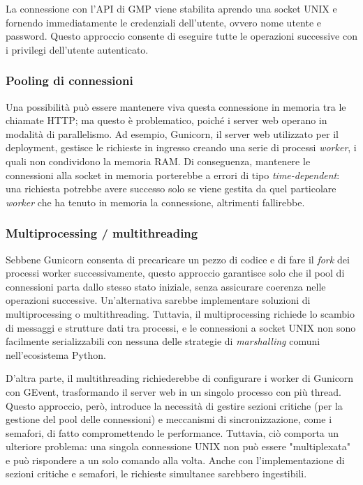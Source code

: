 La connessione con l'API di GMP viene stabilita aprendo una socket UNIX e fornendo immediatamente le credenziali dell'utente, ovvero nome utente e password. Questo approccio consente di eseguire tutte le operazioni successive con i privilegi dell'utente autenticato.

\subsubsection{Pooling di connessioni}
Una possibilità può essere mantenere viva questa connessione in memoria tra le chiamate HTTP; ma questo è problematico, poiché i server web operano in modalità di parallelismo. Ad esempio, Gunicorn, il server web utilizzato per il deployment, gestisce le richieste in ingresso creando una serie di processi \emph{worker}, i quali non condividono la memoria RAM. Di conseguenza, mantenere le connessioni alla socket in memoria porterebbe a errori di tipo \emph{time-dependent}: una richiesta potrebbe avere successo solo se viene gestita da quel particolare \emph{worker} che ha tenuto in memoria la connessione, altrimenti fallirebbe.

\subsubsection{Multiprocessing / multithreading}
Sebbene Gunicorn consenta di precaricare un pezzo di codice e di fare il \emph{fork} dei processi worker successivamente, questo approccio garantisce solo che il pool di connessioni parta dallo stesso stato iniziale, senza assicurare coerenza nelle operazioni successive. Un'alternativa sarebbe implementare soluzioni di multiprocessing o multithreading. Tuttavia, il multiprocessing richiede lo scambio di messaggi e strutture dati tra processi, e le connessioni a socket UNIX non sono facilmente serializzabili con nessuna delle strategie di \emph{marshalling} comuni nell'ecosistema Python.

D'altra parte, il multithreading richiederebbe di configurare i worker di Gunicorn con GEvent, trasformando il server web in un singolo processo con più thread. Questo approccio, però, introduce la necessità di gestire sezioni critiche (per la gestione del pool delle connessioni) e meccanismi di sincronizzazione, come i semafori, di fatto compromettendo le performance. Tuttavia, ciò comporta un ulteriore problema: una singola connessione UNIX non può essere "multiplexata" e può rispondere a un solo comando alla volta. Anche con l'implementazione di sezioni critiche e semafori, le richieste simultanee sarebbero ingestibili.

